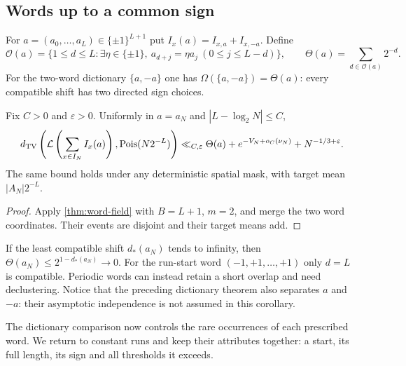 \subsection{Words up to a common sign}
For $a=(a_0,\ldots,a_L)\in\{\pm1\}^{L+1}$ put
$I_x(a)=I_{x,a}+I_{x,-a}$. Define
\begin{equation}\label{eq:overlap-definition}
 \mathcal O(a)=\{1\le d\le L:\exists\eta\in\{\pm1\},\
         a_{d+j}=\eta a_j\ (0\le j\le L-d)\},\qquad
 \Theta(a)=\sum_{d\in\mathcal O(a)}2^{-d}.
\end{equation}
For the two-word dictionary $\{a,-a\}$ one has
$\Omega(\{a,-a\})=\Theta(a)$: every compatible shift has two directed
sign choices.
\begin{corollary}\label{thm:patterns}
Fix $C>0$ and $\varepsilon>0$. Uniformly in $a=a_N$ and
$|L-\log_2N|\le C$,
\begin{equation}\label{eq:pattern-rate}
 d_{\mathrm{TV}}\left(\mathcal L\left(\sum_{x\in I_N}I_x(a)\right),\operatorname{Pois}(N2^{-L})\right)
 \ll_{C,\varepsilon}\Theta(a)+e^{-V_N+o_C(\nu_N)}+N^{-1/3+\varepsilon}.
\end{equation}
The same bound holds under any deterministic spatial mask, with target
mean $|A_N|2^{-L}$.
\end{corollary}
\begin{proof}
Apply \cref{thm:word-field} with $B=L+1$, $m=2$, and merge the two word
coordinates. Their events are disjoint and their target means add.
\end{proof}
If the least compatible shift $d_*(a_N)$ tends to infinity, then
$\Theta(a_N)\le2^{1-d_*(a_N)}\to0$. For the run-start word
$(-1,+1,\ldots,+1)$ only $d=L$ is compatible. Periodic words can instead
retain a short overlap and need declustering. Notice that the preceding
dictionary theorem also separates $a$ and $-a$: their asymptotic
independence is not assumed in this corollary.

The dictionary comparison now controls the rare occurrences of each
prescribed word. We return to constant runs and keep their attributes
together: a start, its full length, its sign and all thresholds it exceeds.

